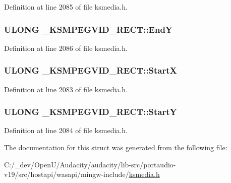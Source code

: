 Definition at line 2085 of file ksmedia.\+h.

\subsubsection[{\texorpdfstring{EndY}{EndY}}]{\setlength{\rightskip}{0pt plus 5cm}U\+L\+O\+NG \+\_\+\+K\+S\+M\+P\+E\+G\+V\+I\+D\+\_\+\+R\+E\+C\+T\+::\+EndY}\hypertarget{struct___k_s_m_p_e_g_v_i_d___r_e_c_t_a612a70905a870490591b7d6e11e1f5d9}{}\label{struct___k_s_m_p_e_g_v_i_d___r_e_c_t_a612a70905a870490591b7d6e11e1f5d9}


Definition at line 2086 of file ksmedia.\+h.

\subsubsection[{\texorpdfstring{StartX}{StartX}}]{\setlength{\rightskip}{0pt plus 5cm}U\+L\+O\+NG \+\_\+\+K\+S\+M\+P\+E\+G\+V\+I\+D\+\_\+\+R\+E\+C\+T\+::\+StartX}\hypertarget{struct___k_s_m_p_e_g_v_i_d___r_e_c_t_a401bcc6de959698570028ca8be72dc3f}{}\label{struct___k_s_m_p_e_g_v_i_d___r_e_c_t_a401bcc6de959698570028ca8be72dc3f}


Definition at line 2083 of file ksmedia.\+h.

\subsubsection[{\texorpdfstring{StartY}{StartY}}]{\setlength{\rightskip}{0pt plus 5cm}U\+L\+O\+NG \+\_\+\+K\+S\+M\+P\+E\+G\+V\+I\+D\+\_\+\+R\+E\+C\+T\+::\+StartY}\hypertarget{struct___k_s_m_p_e_g_v_i_d___r_e_c_t_aeb195261cddab19fb3b8f6c1183648ef}{}\label{struct___k_s_m_p_e_g_v_i_d___r_e_c_t_aeb195261cddab19fb3b8f6c1183648ef}


Definition at line 2084 of file ksmedia.\+h.



The documentation for this struct was generated from the following file\+:\begin{DoxyCompactItemize}
\item 
C\+:/\+\_\+dev/\+Open\+U/\+Audacity/audacity/lib-\/src/portaudio-\/v19/src/hostapi/wasapi/mingw-\/include/\hyperlink{ksmedia_8h}{ksmedia.\+h}\end{DoxyCompactItemize}
